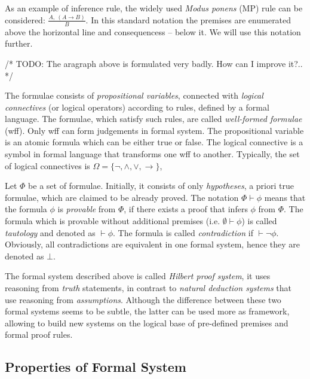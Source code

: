 \documentclass[article]{aaltoseries}
\begin{document}
As an example of inference rule, the widely used \textit{Modus ponens} (MP) rule can be considered: ${ {\frac {A,\ (A\rightarrow B)}{B}}}$. In this standard notation the premises are enumerated above the horizontal line and consequencess -- below it. We will use this notation further. 

/* TODO: The aragraph above is formulated very badly. How can I improve it?.. */


The formulae consists of \textit{propositional variables}, connected with \textit{logical connectives} (or logical operators) according to rules, defined by a formal language. The formulae, which satisfy such rules, are called \textit{well-formed formulae} (wff). Only wff can form judgements in formal system. The propositional variable is an atomic formula which can be either true or false. The logical connective is a symbol in formal language that transforms one wff to another. Typically, the set of logical connectives is $\Omega = \{ \neg, \land, \lor, \rightarrow \}$,

Let $\Phi$ be a set of formulae. Initially, it consists of only \textit{hypotheses}, a priori true formulae, which are claimed to be already proved. The notation $\Phi \vdash \phi$ means that the formula $\phi$ is \textit{provable} from $\Phi$, if there exists a proof that infers $\phi$ from $\Phi$. The formula which is provable without additional premises (i.e. $\emptyset \vdash \phi$) is called \textit{tautology} and denoted as $ \vdash \phi $. The formula is called \textit{contradiction} if $\vdash \neg \phi$. Obviously, all contradictions are equivalent in one formal system, hence they are denoted as $\bot$.

The formal system described above is called \textit{Hilbert proof system}, it uses reasoning from \textit{truth} statements, in contrast to \textit{natural deduction systems} that use reasoning from \textit{assumptions}. Although the difference between these two formal systems seems to be subtle, the latter can be used more as framework, allowing to build new systems on the logical base of pre-defined premises and formal proof rules. %

\subsection{Properties of Formal System}
\end{document}

